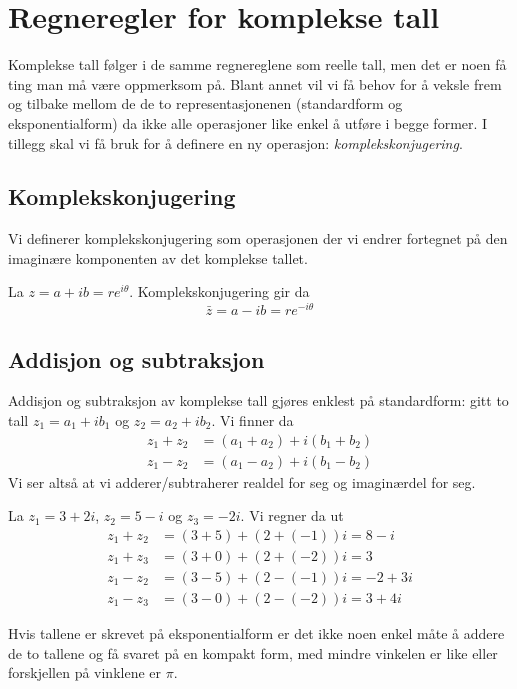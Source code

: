 \documentclass[a4paper,norsk,12pt]{article}
\newcounter{exa}
\begin{document}
\section{Regneregler for komplekse tall}
Komplekse tall følger i de samme regnereglene som reelle tall, men det er noen få ting man må være oppmerksom på. Blant annet vil vi få behov for å veksle frem og tilbake mellom de de to representasjonenen (standardform og eksponentialform) da ikke alle operasjoner like enkel å utføre i begge former. I tillegg skal vi få bruk for å definere en ny operasjon: \emph{komplekskonjugering}.

\subsection{Komplekskonjugering}
Vi definerer komplekskonjugering som operasjonen der vi endrer fortegnet på den imaginære komponenten av det komplekse tallet. 
\begin{tdef}
	La $z = a + ib = re^{i\theta}$. Komplekskonjugering gir da
	\begin{displaymath}
		\bar{z} = a-ib = re^{-i\theta}
	\end{displaymath}
\end{tdef}

\subsection{Addisjon og subtraksjon}
Addisjon og subtraksjon av komplekse tall gjøres enklest på standardform: gitt to tall $z_1 = a_1 + ib_1$ og $z_2 = a_2 + ib_2$. Vi finner da
\begin{align*}
	z_1 + z_2 &= (a_1+a_2) + i(b_1+b_2) \\
	z_1 - z_2 &= (a_1-a_2) + i(b_1-b_2) 
\end{align*}
Vi ser altså at vi adderer/subtraherer realdel for seg og imaginærdel for seg.

\begin{texample}
	La $z_1 = 3+ 2i$, $z_2 = 5-i$ og $z_3 = -2i$. Vi regner da ut
	\begin{align*}
		z_1 + z_2 &= (3+5) + (2+(-1))i = 8 - i \\ 
		z_1 + z_3 &= (3+0) + (2+(-2))i = 3 \\
		z_1 - z_2 &= (3-5) + (2-(-1))i = -2 + 3i \\ 
		z_1 - z_3 &= (3-0) + (2-(-2))i = 3 + 4i 
	\end{align*}
\end{texample}
Hvis tallene er skrevet på eksponentialform er det ikke noen enkel måte å addere de to tallene og få svaret på en kompakt form, med mindre vinkelen er like eller forskjellen på vinklene er $\pi$.
\end{document}
